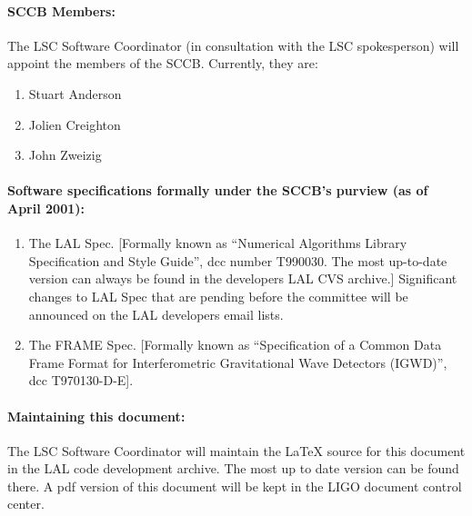 \documentclass[]{ligodcc}
\begin{document}
\paragraph*{SCCB Members: \\}

The LSC Software Coordinator (in consultation with the LSC
spokesperson) will appoint the members of the SCCB. Currently, they
are:
\begin{enumerate}
\item
\vskip -0.1in
Stuart Anderson
\item
Jolien Creighton
\item
John Zweizig
\end{enumerate}

\paragraph*{Software specifications formally under the SCCB's purview
(as of April 2001):\\}
\begin{enumerate}
\item
\vskip -0.3in
The LAL Spec. [Formally known as ``Numerical Algorithms Library
Specification and Style Guide'', dcc number T990030. The most up-to-date
version can always be found in the developers LAL CVS archive.]
Significant changes to LAL Spec that are pending before the committee
will be announced on the LAL developers email lists.
\item
The FRAME Spec. [Formally known as ``Specification of a Common Data
Frame Format for Interferometric Gravitational Wave Detectors (IGWD)'',
dcc T970130-D-E].
\end{enumerate}

\paragraph*{Maintaining this document:\\}
The LSC Software Coordinator will maintain the LaTeX source for this
document in the LAL code development archive.  The most up to date
version can be found there.  A pdf version of this document will be
kept in the LIGO document control center.
\end{document}
